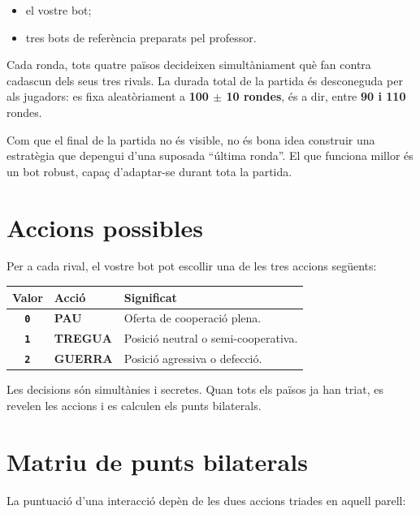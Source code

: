 \documentclass[12pt,a4paper]{report}
\begin{document}
\begin{itemize}
  \item el vostre bot;
  \item tres bots de referència preparats pel professor.
\end{itemize}

Cada ronda, tots quatre països decideixen simultàniament què fan contra cadascun
dels seus tres rivals. La durada total de la partida és desconeguda per als
jugadors: es fixa aleatòriament a \textbf{100 \(\pm\) 10 rondes}, és a dir,
entre \textbf{90 i 110} rondes.

\begin{tcolorbox}[colback=softyellow,colframe=upcblue,title=Idea clau del disseny]
Com que el final de la partida no és visible, no és bona idea construir una
estratègia que depengui d'una suposada ``última ronda''. El que funciona millor
és un bot robust, capaç d'adaptar-se durant tota la partida.
\end{tcolorbox}

\section{Accions possibles}

Per a cada rival, el vostre bot pot escollir una de les tres accions següents:

\begin{center}
\begin{tabularx}{0.95\textwidth}{>{\bfseries}c >{\bfseries}l Y}
\toprule
Valor & Acció & Significat \\
\midrule
\texttt{0} & PAU & Oferta de cooperació plena. \\
\texttt{1} & TREGUA & Posició neutral o semi-cooperativa. \\
\texttt{2} & GUERRA & Posició agressiva o defecció. \\
\bottomrule
\end{tabularx}
\end{center}

Les decisions són simultànies i secretes. Quan tots els països ja han triat, es
revelen les accions i es calculen els punts bilaterals.

\section{Matriu de punts bilaterals}

La puntuació d'una interacció depèn de les dues accions triades en aquell parell:
\end{document}
